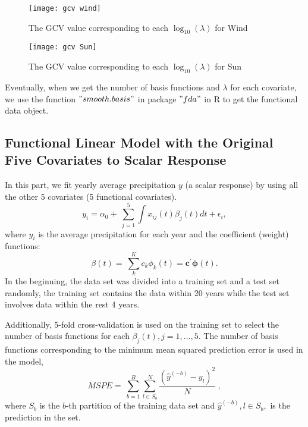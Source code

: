 \begin{figure}[H] %
\centering %
\texttt{[image: gcv wind]} %
\caption{The GCV value corresponding to each $\log_{10}(\lambda)$ for Wind} %
\label{fig: gcvwind} %
\end{figure}

\begin{figure}[H] %
\centering %
\texttt{[image: gcv Sun]} %
\caption{The GCV value corresponding to each $\log_{10}(\lambda)$ for Sun} %
\label{fig:gcvsun} %
\end{figure}
Eventually, when we get the number of basis functions and $\lambda$ for each covariate, we use the function $" smooth.basis"$ in package $"fda"$ in R to get the functional data object. 

\subsection{Functional Linear Model with the Original Five Covariates to Scalar Response}
In this part, we fit yearly average precipitation $y$ (a scalar response) by using all the other 5 covariates (5 functional covariates). \\
$$y_i=\alpha_0+\ \sum_{j=1}^{5}\int{x_{ij}\left(t\right)\beta_j\left(t\right)dt}+\epsilon_i,$$
where $y_i$ is the average precipitation for each year and the coefficient (weight) functions:
$$\beta\left(t\right)=\ \sum_{k}^{K}{c_k\phi_k\left(t\right)}=\bm{c}^\prime\bm{\phi}\left(t\right).$$
In the beginning, the data set was divided into a training set and a test set randomly, the training set contains the data within 20 years while the test set involves data within the rest 4 years.

Additionally, 5-fold cross-validation is used on the training set to select the number of basis functions for each $\beta_j(t),j = 1,\dots,5.$ The number of basis functions corresponding to the minimum mean squared prediction error is used in the model,
$$MSPE=\ \sum_{b=1}^{B}\sum_{l\in S_b}^{N}{\frac{\left({\hat{y}}^{\left(-b\right)}-y_l\right)^2}{N}\ },$$
where $S_b$ is the $b$-th partition of the training data set and ${\hat{y}}^{(-b)},l\in S_b,$ is the prediction in the set. 

